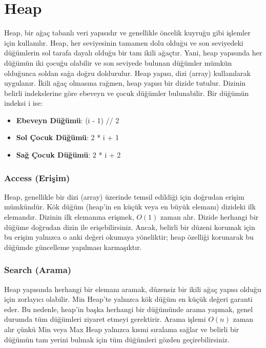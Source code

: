 \section{Heap}

Heap, bir ağaç tabanlı veri yapısıdır ve genellikle öncelik kuyruğu gibi işlemler için kullanılır. Heap, her seviyesinin tamamen dolu olduğu ve son seviyedeki düğümlerin sol tarafa dayalı olduğu bir tam ikili ağaçtır. Yani, heap yapısında her düğümün iki çocuğu olabilir ve son seviyede bulunan düğümler mümkün olduğunca soldan sağa doğru doldurulur. Heap yapısı, dizi (array) kullanılarak uygulanır. İkili ağaç olmasına rağmen, heap yapısı bir dizide tutulur. Dizinin belirli indekslerine göre ebeveyn ve çocuk düğümler bulunabilir. Bir düğümün indeksi i ise:

\begin{itemize}
    \item \textbf{Ebeveyn Düğümü}: (i - 1) // 2
    \item \textbf{Sol Çocuk Düğümü}: 2 * i + 1
    \item \textbf{Sağ Çocuk Düğümü}: 2 * i + 2
\end{itemize}

\subsubsection{Access (Erişim)}

Heap, genellikle bir dizi (array) üzerinde temsil edildiği için doğrudan erişim mümkündür. Kök düğüm (heap’in en küçük veya en büyük elemanı) dizideki ilk elemandır. Dizinin ilk elemanına erişmek, $O(1)$ zaman alır. Dizide herhangi bir düğüme doğrudan dizin ile erişebilirsiniz. Ancak, belirli bir düzeni korumak için bu erişim yalnızca o anki değeri okumaya yöneliktir; heap özelliği korunarak bu düğümde güncelleme yapılması karmaşıktır.

\subsubsection{Search (Arama)}

Heap yapısında herhangi bir elemanı aramak, düzensiz bir ikili ağaç yapısı olduğu için zorlayıcı olabilir. Min Heap'te yalnızca kök düğüm en küçük değeri garanti eder. Bu nedenle, heap’in başka herhangi bir düğümünde arama yapmak, genel durumda tüm düğümleri ziyaret etmeyi gerektirir. Arama işlemi $O(n)$ zaman alır çünkü Min veya Max Heap yalnızca kısmi sıralama sağlar ve belirli bir düğümün tam yerini bulmak için tüm düğümleri gözden geçirebilirsiniz.

